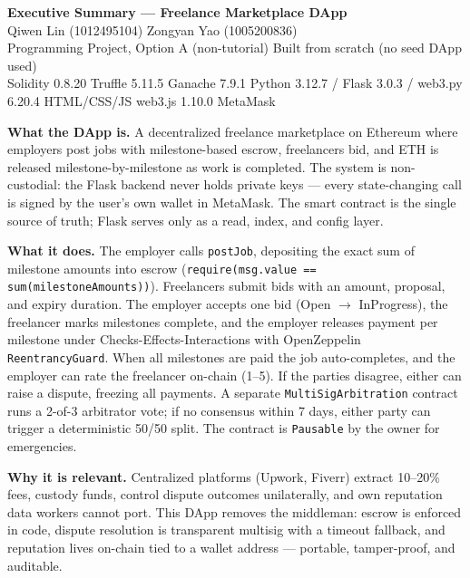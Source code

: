 \documentclass[11pt]{article}
\begin{document}
\begin{center}
    {\Large\textbf{Executive Summary --- Freelance Marketplace DApp}}\\[3pt]
    {\small Qiwen Lin (1012495104) \textbullet{} Zongyan Yao (1005200836)}\\[2pt]
    {\small Programming Project, Option A (non-tutorial) \textbullet{} Built from scratch (no seed DApp used)}\\[1pt]
    {\small Solidity 0.8.20 \textbullet{} Truffle 5.11.5 \textbullet{} Ganache 7.9.1 \textbullet{} Python 3.12.7 / Flask 3.0.3 / web3.py 6.20.4 \textbullet{} HTML/CSS/JS \textbullet{} web3.js 1.10.0 \textbullet{} MetaMask}
\end{center}

\textbf{What the DApp is.}
A decentralized freelance marketplace on Ethereum where employers post jobs with milestone-based escrow, freelancers bid, and ETH is released milestone-by-milestone as work is completed. The system is non-custodial: the Flask backend never holds private keys --- every state-changing call is signed by the user's own wallet in MetaMask. The smart contract is the single source of truth; Flask serves only as a read, index, and config layer.

\textbf{What it does.}
The employer calls \texttt{postJob}, depositing the exact sum of milestone amounts into escrow (\texttt{require(msg.value == sum(milestoneAmounts))}). Freelancers submit bids with an amount, proposal, and expiry duration. The employer accepts one bid (Open $\to$ InProgress), the freelancer marks milestones complete, and the employer releases payment per milestone under Checks-Effects-Interactions with OpenZeppelin \texttt{ReentrancyGuard}. When all milestones are paid the job auto-completes, and the employer can rate the freelancer on-chain (1--5). If the parties disagree, either can raise a dispute, freezing all payments. A separate \texttt{MultiSigArbitration} contract runs a 2-of-3 arbitrator vote; if no consensus within 7 days, either party can trigger a deterministic 50/50 split. The contract is \texttt{Pausable} by the owner for emergencies.

\textbf{Why it is relevant.}
Centralized platforms (Upwork, Fiverr) extract 10--20\% fees, custody funds, control dispute outcomes unilaterally, and own reputation data workers cannot port. This DApp removes the middleman: escrow is enforced in code, dispute resolution is transparent multisig with a timeout fallback, and reputation lives on-chain tied to a wallet address --- portable, tamper-proof, and auditable.
\end{document}
